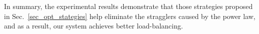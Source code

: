 \documentclass[conference]{IEEEtran}
\begin{document}
In summary, the experimental results demonstrate that those strategies proposed in Sec.~\ref{sec_opt_stategies} help eliminate the stragglers caused by the power law, and as a result, our system achieves better load-balancing.








\end{document}
